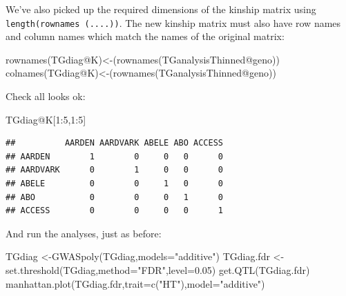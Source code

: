 \documentclass[
]{book}
\newenvironment{Shaded}{\begin{snugshade}}{\end{snugshade}}
\newcommand{\AttributeTok}[1]{\textcolor[rgb]{0.77,0.63,0.00}{#1}}
\newcommand{\DecValTok}[1]{\textcolor[rgb]{0.00,0.00,0.81}{#1}}
\newcommand{\FloatTok}[1]{\textcolor[rgb]{0.00,0.00,0.81}{#1}}
\newcommand{\FunctionTok}[1]{\textcolor[rgb]{0.00,0.00,0.00}{#1}}
\newcommand{\NormalTok}[1]{#1}
\newcommand{\OtherTok}[1]{\textcolor[rgb]{0.56,0.35,0.01}{#1}}
\newcommand{\SpecialCharTok}[1]{\textcolor[rgb]{0.00,0.00,0.00}{#1}}
\newcommand{\StringTok}[1]{\textcolor[rgb]{0.31,0.60,0.02}{#1}}
\begin{document}
We've also picked up the required dimensions of the kinship matrix using \texttt{length(rownames\ (....))}. The new kinship matrix must also have row names and column names which match the names of the original matrix:

\begin{Shaded}
\begin{Highlighting}[]
\FunctionTok{rownames}\NormalTok{(TGdiag}\SpecialCharTok{@}\NormalTok{K)}\OtherTok{\textless{}{-}}\NormalTok{(}\FunctionTok{rownames}\NormalTok{(TGanalysisThinned}\SpecialCharTok{@}\NormalTok{geno))}
\FunctionTok{colnames}\NormalTok{(TGdiag}\SpecialCharTok{@}\NormalTok{K)}\OtherTok{\textless{}{-}}\NormalTok{(}\FunctionTok{rownames}\NormalTok{(TGanalysisThinned}\SpecialCharTok{@}\NormalTok{geno))}
\end{Highlighting}
\end{Shaded}

Check all looks ok:

\begin{Shaded}
\begin{Highlighting}[]
\NormalTok{TGdiag}\SpecialCharTok{@}\NormalTok{K[}\DecValTok{1}\SpecialCharTok{:}\DecValTok{5}\NormalTok{,}\DecValTok{1}\SpecialCharTok{:}\DecValTok{5}\NormalTok{]}
\end{Highlighting}
\end{Shaded}

\begin{verbatim}
##          AARDEN AARDVARK ABELE ABO ACCESS
## AARDEN        1        0     0   0      0
## AARDVARK      0        1     0   0      0
## ABELE         0        0     1   0      0
## ABO           0        0     0   1      0
## ACCESS        0        0     0   0      1
\end{verbatim}

And run the analyses, just as before:

\begin{Shaded}
\begin{Highlighting}[]
\NormalTok{TGdiag }\OtherTok{\textless{}{-}}\FunctionTok{GWASpoly}\NormalTok{(TGdiag,}\AttributeTok{models=}\StringTok{"additive"}\NormalTok{) }
\NormalTok{TGdiag.fdr }\OtherTok{\textless{}{-}}\FunctionTok{set.threshold}\NormalTok{(TGdiag,}\AttributeTok{method=}\StringTok{"FDR"}\NormalTok{,}\AttributeTok{level=}\FloatTok{0.05}\NormalTok{) }
\FunctionTok{get.QTL}\NormalTok{(TGdiag.fdr) }
\FunctionTok{manhattan.plot}\NormalTok{(TGdiag.fdr,}\AttributeTok{trait=}\FunctionTok{c}\NormalTok{(}\StringTok{"HT"}\NormalTok{),}\AttributeTok{model=}\StringTok{"additive"}\NormalTok{) }
\end{Highlighting}
\end{Shaded}
\end{document}
